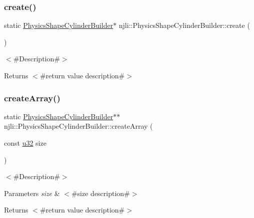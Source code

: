 \subsubsection{\texorpdfstring{create()}{create()}}
{\footnotesize\ttfamily static \mbox{\hyperlink{classnjli_1_1_physics_shape_cylinder_builder}{Physics\+Shape\+Cylinder\+Builder}}$\ast$ njli\+::\+Physics\+Shape\+Cylinder\+Builder\+::create (\begin{DoxyParamCaption}{ }\end{DoxyParamCaption})\hspace{0.3cm}{\ttfamily [static]}}

$<$\#\+Description\#$>$

\begin{DoxyReturn}{Returns}
$<$\#return value description\#$>$ 
\end{DoxyReturn}
\mbox{\label{classnjli_1_1_physics_shape_cylinder_builder_a311d45910de2aad5e481c2162184ae12}} 
\subsubsection{\texorpdfstring{create\+Array()}{createArray()}}
{\footnotesize\ttfamily static \mbox{\hyperlink{classnjli_1_1_physics_shape_cylinder_builder}{Physics\+Shape\+Cylinder\+Builder}}$\ast$$\ast$ njli\+::\+Physics\+Shape\+Cylinder\+Builder\+::create\+Array (\begin{DoxyParamCaption}\item[{const \mbox{\hyperlink{_util_8h_a10e94b422ef0c20dcdec20d31a1f5049}{u32}}}]{size }\end{DoxyParamCaption})\hspace{0.3cm}{\ttfamily [static]}}

$<$\#\+Description\#$>$


\begin{DoxyParams}{Parameters}
{\em size} & $<$\#size description\#$>$\\
\hline
\end{DoxyParams}
\begin{DoxyReturn}{Returns}
$<$\#return value description\#$>$ 
\end{DoxyReturn}
\mbox{\label{classnjli_1_1_physics_shape_cylinder_builder_aa508b55f868d88ab82c2b87070006cd8}} 
